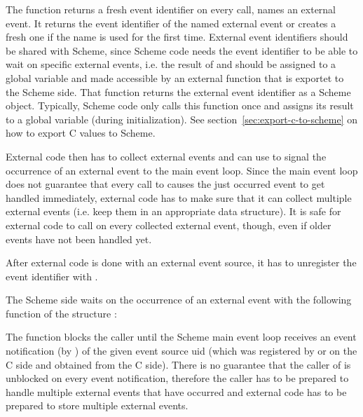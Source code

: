 \begin{protos}
\end{protos}

The  function returns a fresh event
identifier on every call, 
names an external event.  It returns the event identifier of the named
external event or creates a fresh one if the name is used for the
first time.  External event identifiers should be shared with Scheme,
since Scheme code needs the event identifier to be able to wait on
specific external events, i.e.  the result of
 and
 should be assigned to a
global variable and made accessible by an external function that is
exportet to the Scheme side.  That function returns the external
event identifier as a Scheme object.  Typically, Scheme code only
calls this function once and assigns its result to a global variable
(during initialization).  See section~\ref{sec:export-c-to-scheme} on
how to export C values to Scheme.

External code then has to collect external events and can use
 to signal the occurrence of an
external event to the main event loop.  Since the main event loop does
not guarantee that every call to 
causes the just occurred event to get handled immediately, external
code has to make sure that it can collect multiple external events
(i.e. keep them in an appropriate data structure).  It is safe for
external code to call  on every
collected external event, though, even if older events have not been
handled yet.

After external code is done with an external event source, it has to
unregister the event identifier with
.

The Scheme side waits on the occurrence of an external event with the
following function of the structure :

\begin{protos}
\end{protos}

The function  blocks the caller until
the Scheme main event loop receives an event notification (by
) of the given event source uid
(which was registered by  or
 on the C side and obtained
from the C side).  There is no guarantee that the caller of
 is unblocked on every event
notification, therefore the caller has to be prepared to handle
multiple external events that have occurred and external code has to
be prepared to store multiple external events.

